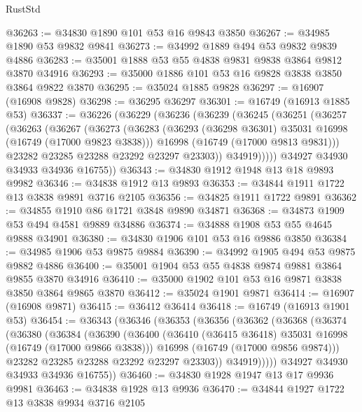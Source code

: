 \begin{lexlean}{RustStd}
\begin{coremodule}
@36263 := @34830 @1890 @101 @53 @16 @9843 @3850
@36267 := @34985 @1890 @53 @9832 @9841
@36273 := @34992 @1889 @494 @53 @9832 @9839 @4886
@36283 := @35001 @1888 @53 @55 @4838 @9831 @9838 @3864 @9812 @3870 @34916
@36293 := @35000 @1886 @101 @53 @16 @9828 @3838 @3850 @3864 @9822 @3870
@36295 := @35024 @1885 @9828
@36297 := @16907 (@16908 @9828)
@36298 := @36295 @36297
@36301 := @16749 (@16913 @1885 @53)
@36337 := @36226
    (@36229
      (@36236
        (@36239
          (@36245
            (@36251
              (@36257
                (@36263
                  (@36267
                    (@36273
                      (@36283
                        (@36293 (@36298 @36301) @35031 @16998 (@16749 (@17000 @9823 @3838)))
                        @16998
                        (@16749 (@17000 @9813 @9831)))
                      @23282
                      @23285
                      @23288
                      @23292
                      @23297
                      @23303))
                  @34919)))))
        @34927
        @34930
        @34933
        @34936
        @16755))
@36343 := @34830 @1912 @1948 @13 @18 @9893 @9982
@36346 := @34838 @1912 @13 @9893
@36353 := @34844 @1911 @1722 @13 @3838 @9891 @3716 @2105
@36356 := @34825 @1911 @1722 @9891
@36362 := @34855 @1910 @86 @1721 @3848 @9890 @34871
@36368 := @34873 @1909 @53 @494 @4581 @9889 @34886
@36374 := @34888 @1908 @53 @55 @4645 @9888 @34901
@36380 := @34830 @1906 @101 @53 @16 @9886 @3850
@36384 := @34985 @1906 @53 @9875 @9884
@36390 := @34992 @1905 @494 @53 @9875 @9882 @4886
@36400 := @35001 @1904 @53 @55 @4838 @9874 @9881 @3864 @9855 @3870 @34916
@36410 := @35000 @1902 @101 @53 @16 @9871 @3838 @3850 @3864 @9865 @3870
@36412 := @35024 @1901 @9871
@36414 := @16907 (@16908 @9871)
@36415 := @36412 @36414
@36418 := @16749 (@16913 @1901 @53)
@36454 := @36343
    (@36346
      (@36353
        (@36356
          (@36362
            (@36368
              (@36374
                (@36380
                  (@36384
                    (@36390
                      (@36400
                        (@36410 (@36415 @36418) @35031 @16998 (@16749 (@17000 @9866 @3838)))
                        @16998
                        (@16749 (@17000 @9856 @9874)))
                      @23282
                      @23285
                      @23288
                      @23292
                      @23297
                      @23303))
                  @34919)))))
        @34927
        @34930
        @34933
        @34936
        @16755))
@36460 := @34830 @1928 @1947 @13 @17 @9936 @9981
@36463 := @34838 @1928 @13 @9936
@36470 := @34844 @1927 @1722 @13 @3838 @9934 @3716 @2105

\end{coremodule}
\end{lexlean}
